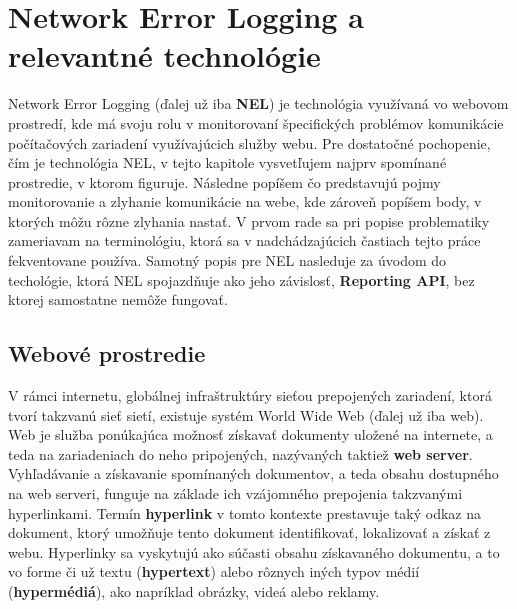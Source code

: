 \chapter{Network Error Logging a relevantné technológie}
\label{nel-and-related-technologies}             


Network Error Logging (ďalej už iba \textbf{NEL}) je technológia využívaná vo webovom prostredí, 
kde má svoju rolu v monitorovaní špecifických problémov komunikácie počítačových zariadení využívajúcich služby webu.
Pre dostatočné pochopenie, čím je technológia NEL, v tejto kapitole vysvetľujem najprv 
spomínané prostredie, v ktorom figuruje. 
Následne popíšem čo predstavujú pojmy monitorovanie a zlyhanie komunikácie na webe, kde zároveň popíšem body, v ktorých môžu rôzne zlyhania nastať. 
V prvom rade sa pri popise problematiky zameriavam na terminológiu, ktorá sa v nadchádzajúcich častiach tejto práce fekventovane používa. 
Samotný popis pre NEL nasleduje za úvodom do techológie, ktorá NEL spojazdňuje ako jeho závislosť, \textbf{Reporting API}, bez ktorej samostatne nemôže fungovať. %


\section{Webové prostredie}
\label{webove-prostredie}

V rámci internetu, globálnej infraštruktúry sieťou prepojených zariadení, ktorá tvorí takzvanú sieť sietí, existuje systém World Wide Web (ďalej už iba web).
Web je služba ponúkajúca možnosť získavať dokumenty uložené na internete, a teda na zariadeniach do neho pripojených, nazývaných taktiež \textbf{web server}. 
Vyhľadávanie a získavanie spomínaných dokumentov, a teda obsahu dostupného na web serveri, funguje na základe ich vzájomného prepojenia takzvanými hyperlinkami.
Termín \textbf{hyperlink} v tomto kontexte prestavuje taký odkaz na dokument, ktorý umožňuje tento dokument identifikovať, lokalizovať a získať z webu. 
Hyperlinky sa vyskytujú ako súčasti obsahu získavaného dokumentu, a to vo forme či už textu (\textbf{hypertext}) alebo rôznych iných typov médií (\textbf{hypermédiá}), ako napríklad obrázky, videá alebo reklamy. 


